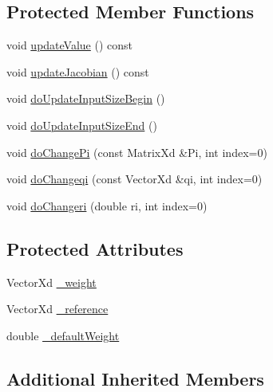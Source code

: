 \subsection*{Protected Member Functions}
\begin{DoxyCompactItemize}
\item 
void \hyperlink{classocra_1_1WeightedSquareDistanceFunction_a3edae3085677a5ac54b4d5bcdfcc1901}{update\+Value} () const
\item 
void \hyperlink{classocra_1_1WeightedSquareDistanceFunction_adb2aad2190e474c2975a5544f0122585}{update\+Jacobian} () const
\item 
void \hyperlink{classocra_1_1WeightedSquareDistanceFunction_aff6adfc9daa9242233f58a8c2c16ba7d}{do\+Update\+Input\+Size\+Begin} ()
\item 
void \hyperlink{classocra_1_1WeightedSquareDistanceFunction_ab05ab6021a40ed308b7e0d67b5a55b82}{do\+Update\+Input\+Size\+End} ()
\item 
void \hyperlink{classocra_1_1WeightedSquareDistanceFunction_a2364e1c3908842eb252128256015d57b}{do\+Change\+Pi} (const Matrix\+Xd \&Pi, int index=0)
\item 
void \hyperlink{classocra_1_1WeightedSquareDistanceFunction_a0ba9644814cf959e34ffc581a6b1e37a}{do\+Changeqi} (const Vector\+Xd \&qi, int index=0)
\item 
void \hyperlink{classocra_1_1WeightedSquareDistanceFunction_afd6f2e03701395eed4db1b72588562ed}{do\+Changeri} (double ri, int index=0)
\end{DoxyCompactItemize}
\subsection*{Protected Attributes}
\begin{DoxyCompactItemize}
\item 
Vector\+Xd \hyperlink{classocra_1_1WeightedSquareDistanceFunction_a0363490acdf9ea0bbfc29e0721a757ed}{\+\_\+weight}
\item 
Vector\+Xd \hyperlink{classocra_1_1WeightedSquareDistanceFunction_a29e7d4c1ce99abef4f2196f11f0de9de}{\+\_\+reference}
\item 
double \hyperlink{classocra_1_1WeightedSquareDistanceFunction_a825041d63692b04a742c57dde4f80930}{\+\_\+default\+Weight}
\end{DoxyCompactItemize}
\subsection*{Additional Inherited Members}


